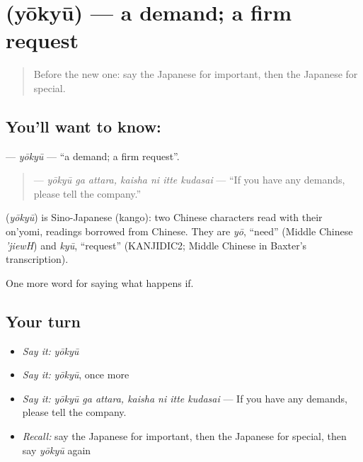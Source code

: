 \section[\texorpdfstring{\ja{ようきゅう} (yōkyū)}{ようきゅう (yōkyū)}]{ (yōkyū) — a demand; a firm request}

\label{lesson:JA-C369-youkyuu}



\begin{quote}
Before the new one: say the Japanese for important, then the Japanese for special.
\end{quote}

\subsection*{You'll want to know: }
\textbf{} — \emph{yōkyū} — \textquotedblleft{}a demand; a firm request\textquotedblright{}.

\begin{quote}
\textbf{   } — \emph{yōkyū ga attara, kaisha ni itte kudasai} — \textquotedblleft{}If you have any demands, please tell the company.\textquotedblright{}
\end{quote}

\begin{cousinweb}
\textbf{} (\emph{yōkyū}) is Sino-Japanese (kango): two Chinese characters read with their on'yomi, readings borrowed from Chinese. They are \emph{yō}, \textquotedblleft{}need\textquotedblright{} (Middle Chinese \emph{'jiewH}) and \emph{kyū}, \textquotedblleft{}request\textquotedblright{} (KANJIDIC2; Middle Chinese in Baxter's transcription).
\end{cousinweb}

\begin{grammarlens}[title={What you've built}]
One more word for saying what happens if.
\end{grammarlens}

\subsection*{Your turn}
\begin{itemize}
\raggedright
  \item \emph{Say it:} \emph{yōkyū}
  \item \emph{Say it:} \emph{yōkyū}, once more
  \item \emph{Say it:} \emph{yōkyū ga attara, kaisha ni itte kudasai} — If you have any demands, please tell the company.
  \item \emph{Recall:} say the Japanese for important, then the Japanese for special, then say \emph{yōkyū} again
\end{itemize}

